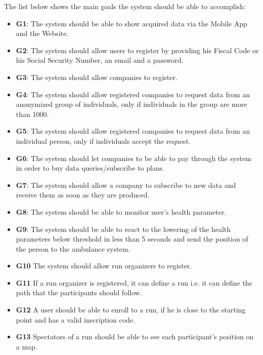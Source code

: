 The list below shows the main goals the system should be able to accomplish:

\begin{itemize}
    \item \textbf{G1}: The system should be able to show acquired data via the Mobile App and the Website.
    \item \textbf{G2}: The system should allow users to register by providing his Fiscal Code or his Social Security Number, an email and a password.
    \item \textbf{G3}: The system should allow companies to register.
    \item \textbf{G4}: The system should allow registered companies to request data from an anonymized group of individuals, only if individuals in the group are more than 1000.
    \item \textbf{G5}: The system should allow registered companies to request data from an individual person, only if individuals accept the request.

    \item \textbf{G6}: The system should let companies to be able to pay through the system in order to buy data queries/subscribe to plans.

    \item \textbf{G7}: The system should allow a company to subscribe to new data and receive them as soon as they are produced.
    \item \textbf{G8}: The system should be able to monitor user's health parameter.
    \item \textbf{G9}: The system should be able to react to the lowering of the health parameters below threshold in less than 5 seconds and send the position of the person to the ambulance system. 
    
    \item \textbf{G10} The system should allow run organizers to register.
    \item \textbf{G11} If a run organizer is registered, it can define a run i.e. it can define the path that the participants should follow.
    \item \textbf{G12} A user should be able to enroll to a run, if he is close to the starting point and has a valid inscription code.
    \item \textbf{G13} Spectators of a run should be able to see each participant's position on a map.
\end{itemize}





